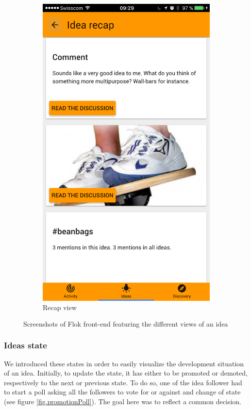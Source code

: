 \documentclass[a4paper,12pt,twoside]{article}
\begin{document}
\begin{figure}[!htb]
\begin{subfigure}[t]{.32\textwidth}
        \includegraphics[width=\textwidth]{images/ideaRecap.png}
        \caption{Recap view}
        \label{fig.idea.recap}
    \end{subfigure}
    \caption{Screenshots of Flok front-end featuring the different views of an idea}
    \label{fig.idea}
\end{figure}

\FloatBarrier
\subsubsection{Ideas state}
\label{sec.ideasState}
We introduced these states in order to easily visualize the development situation of an idea.
Initially, to update the state, it has either to be promoted or demoted, respectively to the next or previous state.
To do so, one of the idea follower had to start a poll asking all the followers to vote for or against and change of state (see figure \ref{fig.promotionPoll}).
The goal here was to reflect a common decision.
\end{document}
